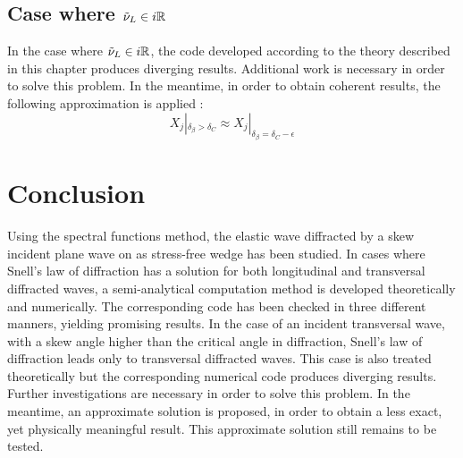 \subsection{Case where $\tilde{\nu}_L \in i\mathbb{R}$}
In the case where $\tilde{\nu}_L \in i\mathbb{R}$, the code developed according to the theory described in this chapter produces diverging results. Additional work is necessary in order to solve this problem. In the meantime, in order to obtain coherent results, the following approximation is applied :
\begin{equation}
X_j|_{\delta_{\beta}>\delta_C} \approx X_j|_{\delta_{\beta}=\delta_C-\epsilon}
\end{equation}

\section*{Conclusion}
Using the spectral functions method, the elastic wave diffracted by a skew incident plane wave on as stress-free wedge has been studied. In cases where Snell's law of diffraction has a solution for both longitudinal and transversal diffracted waves, a semi-analytical computation method is developed theoretically and numerically. The corresponding code has been checked in three different manners, yielding promising results. In the case of an incident transversal wave, with a skew angle higher than the critical angle in diffraction, Snell's law of diffraction leads only to transversal diffracted waves. This case is also treated theoretically but the corresponding numerical code produces diverging results. Further investigations are necessary in order to solve this problem. In the meantime, an approximate solution is proposed, in order to obtain a less exact, yet physically meaningful result. This approximate solution still remains to be tested.

